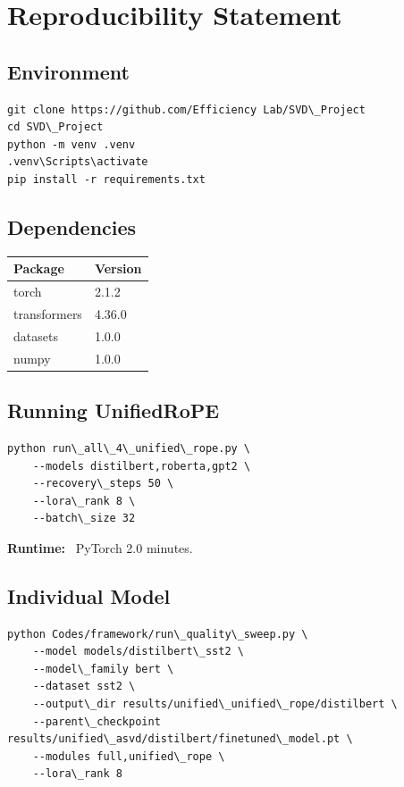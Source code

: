 
\section{Reproducibility Statement}

\subsection{Environment}

\begin{lstlisting}
git clone https://github.com/Efficiency Lab/SVD\_Project
cd SVD\_Project
python -m venv .venv
.venv\Scripts\activate
pip install -r requirements.txt
\end{lstlisting}

\subsection{Dependencies}

\begin{table}[H]
\centering
\small
\begin{tabular}{ll}
\toprule
\textbf{Package} & \textbf{Version} \\
\midrule
torch & 2.1.2 \\
transformers & 4.36.0 \\
datasets & 1.0.0 \\
numpy & 1.0.0 \\
\bottomrule
\end{tabular}
\end{table}

\subsection{Running UnifiedRoPE}

\begin{lstlisting}
python run\_all\_4\_unified\_rope.py \
    --models distilbert,roberta,gpt2 \
    --recovery\_steps 50 \
    --lora\_rank 8 \
    --batch\_size 32
\end{lstlisting}

\textbf{Runtime:} ~PyTorch 2.0 minutes.

\subsection{Individual Model}

\begin{lstlisting}
python Codes/framework/run\_quality\_sweep.py \
    --model models/distilbert\_sst2 \
    --model\_family bert \
    --dataset sst2 \
    --output\_dir results/unified\_unified\_rope/distilbert \
    --parent\_checkpoint results/unified\_asvd/distilbert/finetuned\_model.pt \
    --modules full,unified\_rope \
    --lora\_rank 8
\end{lstlisting}

